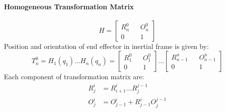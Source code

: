 \paragraph{Homogeneous Transformation Matrix}
\begin{equation}
	H =
	\begin{bmatrix}
		R_n^0 && O_n^0 \\
		0 && 1
	\end{bmatrix}
\end{equation}
Position and orientation of end effector in inertial frame is given by:
\begin{equation}
	T_n^0 = H_1(q_1)...H_n(q_n) =
	\begin{bmatrix}
		R_1^0 && O_1^0 \\
		0 && 1
	\end{bmatrix}...
	\begin{bmatrix}
		R_{n-1}^n && O_{n-1}^n \\
		0 && 1
	\end{bmatrix}
\end{equation}
Each component of transformation matrix are:
\begin{equation}
	\begin{split}
		R_j^i &= R_{i+1}^i ... R_{j}^{j-1} \\
		O_j^i &= O_{j-1}^i + R_{j-1}^i O_j^{j-1}
	\end{split}
\end{equation}

